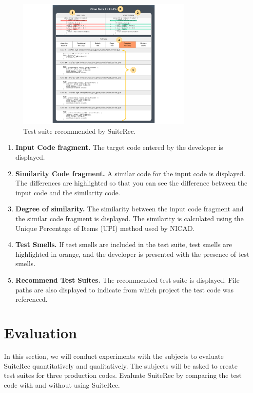 \documentclass[conference]{IEEEtran}
\begin{document}
\begin{figure}[htbp]
\centerline{\includegraphics[width=8.7cm]{SuiteRec.pdf}}
\caption{Test suite recommended by SuiteRec.}
\label{fig}
\end{figure}

 \begin{enumerate}
\renewcommand{\labelenumi}{(\arabic{enumi})}
\item{\textbf{Input Code fragment. }The target code entered by the developer is displayed.}
\item{\textbf{Similarity Code fragment. }A similar code for the input code is displayed. The differences are highlighted so that you can see the difference between the input code and the similarity code.}
\item{\textbf{Degree of similarity. }The similarity between the input code fragment and the similar code fragment is displayed. The similarity is calculated using the Unique Percentage of Items (UPI) method used by NICAD. }
\item{\textbf{Test Smells. }If test smells are included in the test suite, test smells are highlighted in orange, and the developer is presented with the presence of test smells. }
\item{\textbf{Recommend Test Suites. }The recommended test suite is displayed. File paths are also displayed to indicate from which project the test code was referenced. }
\end{enumerate}


\section{Evaluation}
In this section, we will conduct experiments with the subjects to evaluate SuiteRec quantitatively and qualitatively. The subjects will be asked to create test suites for three production codes. Evaluate SuiteRec by comparing the test code with and without using SuiteRec. 
\end{document}
